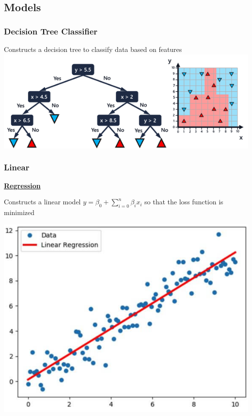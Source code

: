 \subsection{Models}
    \subsubsection{Decision Tree Classifier}
        Constructs a decision tree to classify data based on features\\
        \includegraphics[width = \linewidth]{src/8_ml/images/decision_tree.png}
        

    \subsubsection{Linear}
        {\centering \underline{\textbf{Regression}} \par}
        Constructs a linear model $y = \beta_0 + \sum_{i = 0}^n \beta_i x_i$ so that the loss function is minimized
        {\centering \includegraphics[width = 0.8\linewidth]{src/8_ml/images/linear_regression.png} \par}
        
        
